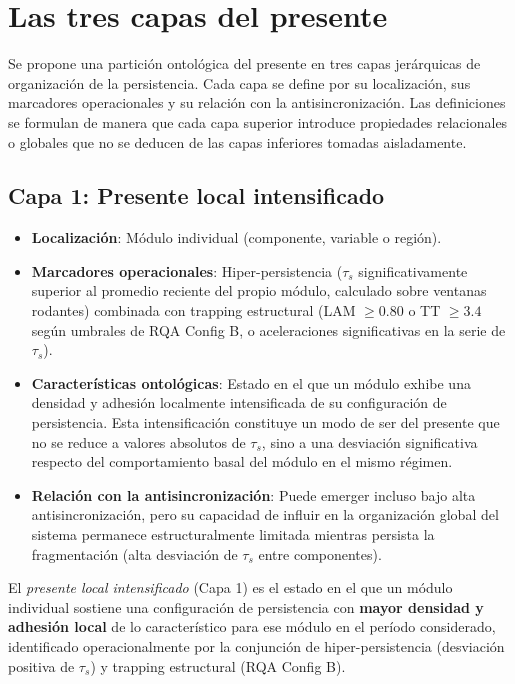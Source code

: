\section{Las tres capas del presente}

Se propone una partición ontológica del presente en tres capas jerárquicas de organización de la persistencia. Cada capa se define por su localización, sus marcadores operacionales y su relación con la antisincronización. Las definiciones se formulan de manera que cada capa superior introduce propiedades relacionales o globales que no se deducen de las capas inferiores tomadas aisladamente.

\subsection{Capa 1: Presente local intensificado}

\begin{itemize}
    \item \textbf{Localización}: Módulo individual (componente, variable o región).
    \item \textbf{Marcadores operacionales}: Hiper-persistencia ($\tau_s$ significativamente superior al promedio reciente del propio módulo, calculado sobre ventanas rodantes) combinada con trapping estructural (LAM $\geq 0.80$ o TT $\geq 3.4$ según umbrales de RQA Config B, o aceleraciones significativas en la serie de $\tau_s$).
    \item \textbf{Características ontológicas}: Estado en el que un módulo exhibe una densidad y adhesión localmente intensificada de su configuración de persistencia. Esta intensificación constituye un modo de ser del presente que no se reduce a valores absolutos de $\tau_s$, sino a una desviación significativa respecto del comportamiento basal del módulo en el mismo régimen.
    \item \textbf{Relación con la antisincronización}: Puede emerger incluso bajo alta antisincronización, pero su capacidad de influir en la organización global del sistema permanece estructuralmente limitada mientras persista la fragmentación (alta desviación de $\tau_s$ entre componentes).
\end{itemize}

\begin{conceptbox}[Definición]
El \textit{presente local intensificado} (Capa 1) es el estado en el que un módulo individual sostiene una configuración de persistencia con \textbf{mayor densidad y adhesión local} de lo característico para ese módulo en el período considerado, identificado operacionalmente por la conjunción de hiper-persistencia (desviación positiva de $\tau_s$) y trapping estructural (RQA Config B).
\end{conceptbox}

